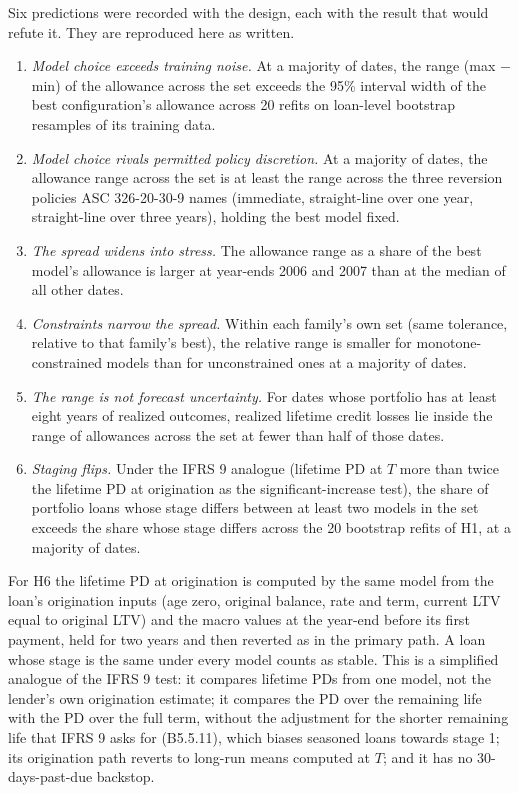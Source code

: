 Six predictions were recorded with the design, each with the result that
would refute it. They are reproduced here as written.

\begin{enumerate}[label=\textbf{H\arabic*.}, leftmargin=*, itemsep=2pt]
\item \emph{Model choice exceeds training noise.} At a majority of dates, the
range (max $-$ min) of the allowance across the set exceeds the 95\% interval
width of the best configuration's allowance across 20 refits on loan-level
bootstrap resamples of its training data.
\item \emph{Model choice rivals permitted policy discretion.} At a majority of
dates, the allowance range across the set is at least the range across the
three reversion policies ASC 326-20-30-9 names (immediate, straight-line over
one year, straight-line over three years), holding the best model fixed.
\item \emph{The spread widens into stress.} The allowance range as a share of
the best model's allowance is larger at year-ends 2006 and 2007 than at the
median of all other dates.
\item \emph{Constraints narrow the spread.} Within each family's own set (same
tolerance, relative to that family's best), the relative range is smaller for
monotone-constrained models than for unconstrained ones at a majority of dates.
\item \emph{The range is not forecast uncertainty.} For dates whose portfolio
has at least eight years of realized outcomes, realized lifetime credit losses
lie inside the range of allowances across the set at fewer than half of those
dates.
\item \emph{Staging flips.} Under the IFRS 9 analogue (lifetime PD at $T$ more
than twice the lifetime PD at origination as the significant-increase test),
the share of portfolio loans whose stage differs between at least two models
in the set exceeds the share whose stage differs across the 20 bootstrap
refits of H1, at a majority of dates.
\end{enumerate}

\noindent For H6 the lifetime PD at origination is computed by the same model
from the loan's origination inputs (age zero, original balance, rate and term,
current LTV equal to original LTV) and the macro values at the year-end before
its first payment, held for two years and then reverted as in the primary
path. A loan whose stage is the same under every model counts as stable. This
is a simplified analogue of the IFRS 9 test: it compares lifetime PDs from one
model, not the lender's own origination estimate; it compares the PD over the
remaining life with the PD over the full term, without the adjustment for the
shorter remaining life that IFRS 9 asks for (B5.5.11), which biases seasoned
loans towards stage 1; its origination path reverts to long-run means
computed at $T$; and it has no 30-days-past-due backstop.
